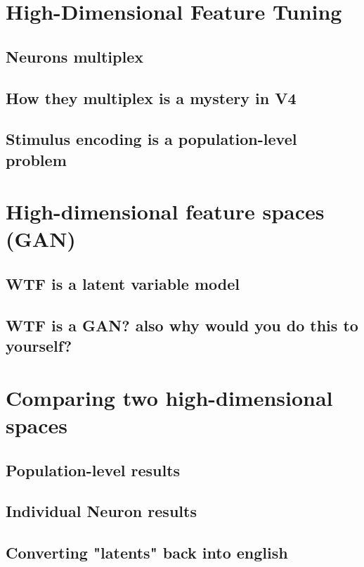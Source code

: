\section{High-Dimensional Feature Tuning}
\subsection{Neurons multiplex}
\subsection{How they multiplex is a mystery in V4}
\subsection{Stimulus encoding is a population-level problem}


\section{High-dimensional feature spaces (GAN)}
\subsection{WTF is a latent variable model}
\subsection{WTF is a GAN? also why would you do this to yourself?}


\section{Comparing two high-dimensional spaces}
\subsection{Population-level results} %
\subsection{Individual Neuron results} %
\subsection{Converting "latents" back into english} %






 